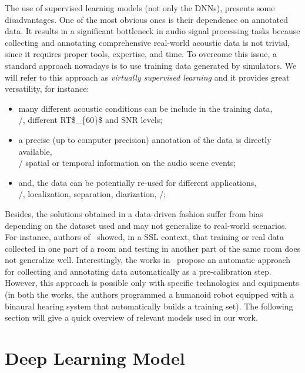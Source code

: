 \mynewline
The use of supervised learning models (not only the \acp{DNN}), presents some disadvantages.
One of the most obvious ones is their dependence on annotated data. It results in a significant bottleneck in audio signal processing tasks because collecting and annotating comprehensive real-world acoustic data is not trivial, since it requires proper tools, expertise, and time.
To overcome this issue, a standard approach nowadays is to use training data generated by simulators.
We will refer to this approach as \textit{virtually supervised learning} and it provides great versatility, for instance:
\begin{itemize}
    \item many different acoustic conditions can be include in the training data,\\\eg/, different \acf{RT$_{60}$} and \acf{SNR} levels;
    \item a precise (up to computer precision) annotation of the data is directly available,\\\eg/ spatial or temporal information on the audio scene events;
    \item and, the data can be potentially re-used for different applications,\\\eg/, localization, separation, diarization, \etc/;
\end{itemize}
Besides, the solutions obtained in a data-driven fashion suffer from bias depending on the dataset used and may not generalize to real-world scenarios.
For instance, authors of~ showed, in a \ac{SSL} context, that training or real data collected in one part of a room and testing in another part of the same room does not generalize well.
Interestingly, the works in~ propose an automatic approach for collecting and annotating data automatically as a pre-calibration step.
However, this approach is possible only with specific technologies and equipments (in both the works, the authors programmed a humanoid robot equipped with a binaural hearing system that automatically builds a training set).
The following section will give a quick overview of relevant models used in our work.

\section{Deep Learning Model}\label{sec:lantern:dnn}

